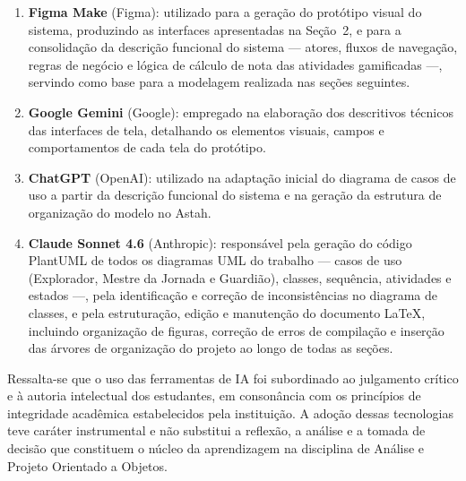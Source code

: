 \documentclass[12pt, a4paper]{article}
\begin{document}
\begin{enumerate}
    \item \textbf{Figma Make} (Figma): utilizado para a geração do protótipo visual do
    sistema, produzindo as interfaces apresentadas na Seção~2, e para a consolidação
    da descrição funcional do sistema — atores, fluxos de navegação, regras de negócio
    e lógica de cálculo de nota das atividades gamificadas —, servindo como base para
    a modelagem realizada nas seções seguintes.

    \item \textbf{Google Gemini} (Google): empregado na elaboração dos descritivos
    técnicos das interfaces de tela, detalhando os elementos visuais, campos e
    comportamentos de cada tela do protótipo.

    \item \textbf{ChatGPT} (OpenAI): utilizado na adaptação inicial do diagrama de
    casos de uso a partir da descrição funcional do sistema e na geração da estrutura
    de organização do modelo no Astah.

    \item \textbf{Claude Sonnet 4.6} (Anthropic): responsável pela geração do código
    PlantUML de todos os diagramas UML do trabalho — casos de uso (Explorador, Mestre
    da Jornada e Guardião), classes, sequência, atividades e estados —, pela
    identificação e correção de inconsistências no diagrama de classes, e pela
    estruturação, edição e manutenção do documento \LaTeX, incluindo organização de
    figuras, correção de erros de compilação e inserção das árvores de organização do
    projeto ao longo de todas as seções.
\end{enumerate}

Ressalta-se que o uso das ferramentas de IA foi subordinado ao julgamento crítico e à
autoria intelectual dos estudantes, em consonância com os princípios de integridade
acadêmica estabelecidos pela instituição. A adoção dessas tecnologias teve caráter
instrumental e não substitui a reflexão, a análise e a tomada de decisão que constituem
o núcleo da aprendizagem na disciplina de Análise e Projeto Orientado a Objetos.
 
\end{document}
